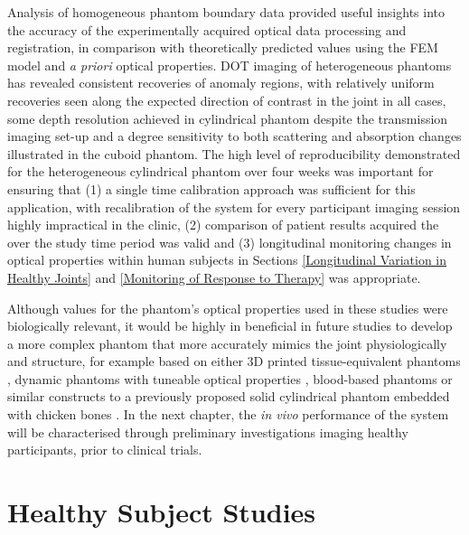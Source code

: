 \documentclass[twoside]{bhamthesis}
\theoremstyle{definition}
\begin{document}
Analysis of homogeneous phantom boundary data provided useful insights into the accuracy of the experimentally acquired optical data processing and registration, in comparison with theoretically predicted values using the FEM model and \textit{a priori} optical properties. DOT imaging of heterogeneous phantoms has revealed consistent recoveries of anomaly regions, with relatively uniform recoveries seen along the expected direction of contrast in the joint in all cases, some depth resolution achieved in cylindrical phantom despite the transmission imaging set-up and a degree sensitivity to both scattering and absorption changes illustrated in the cuboid phantom. The high level of reproducibility demonstrated for the heterogeneous cylindrical phantom over four weeks was important for ensuring that (1) a single time calibration approach was sufficient for this application, with recalibration of the system for every participant imaging session highly impractical in the clinic, (2) comparison of patient results acquired the over the study time period was valid and (3) longitudinal monitoring changes in optical properties within human subjects in Sections \ref{Longitudinal Variation in Healthy Joints} and \ref{Monitoring of Response to Therapy} was appropriate. 

Although values for the phantom's optical properties used in these studies were biologically relevant, it would be highly in beneficial in future studies to develop a more complex phantom that more accurately mimics the joint physiologically and structure, for example based on either 3D printed tissue-equivalent phantoms \cite{dempsey2017geometrically}, dynamic phantoms with tuneable optical properties \cite{ayers2008fabrication}, blood-based phantoms \cite{mcbride1999spectroscopic} or similar constructs to a previously proposed solid cylindrical phantom embedded with chicken bones \cite{xu2001imaging}.  In the next chapter, the \textit{in vivo} performance of the system will be characterised through preliminary investigations imaging healthy participants, prior to clinical trials.

\chapter{Healthy Subject Studies}
\label{chapter:Healthy Subject Studies}
\end{document}

